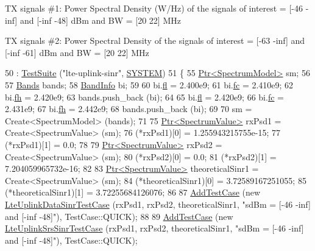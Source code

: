 TX signals \#1\+: Power Spectral Density (W/\+Hz) of the signals of interest = \mbox{[}-\/46 -\/inf\mbox{]} and \mbox{[}-\/inf -\/48\mbox{]} d\+Bm and BW = \mbox{[}20 22\mbox{]} M\+Hz

TX signals \#2\+: Power Spectral Density of the signals of interest = \mbox{[}-\/63 -\/inf\mbox{]} and \mbox{[}-\/inf -\/61\mbox{]} d\+Bm and BW = \mbox{[}20 22\mbox{]} M\+Hz
\begin{DoxyCode}
50   : \hyperlink{classns3_1_1TestSuite_a904b0c40583b744d30908aeb94636d1a}{TestSuite} (\textcolor{stringliteral}{"lte-uplink-sinr"}, \hyperlink{classns3_1_1TestSuite_a1ebfcab34ec8161e085e8e3a1855eae0a90c5529a26ab3a5ffcc6e57040dbd82e}{SYSTEM})
51 \{
55   \hyperlink{classns3_1_1Ptr}{Ptr<SpectrumModel>} sm;
56 
57   \hyperlink{namespacens3_a46ac9188e5cf43bd5292f7b67451246e}{Bands} bands;
58   \hyperlink{structns3_1_1BandInfo}{BandInfo} bi;
59 
60   bi.\hyperlink{structns3_1_1BandInfo_a5e9018ae65c7625cc6d5c3c0067a9104}{fl} = 2.400e9;
61   bi.\hyperlink{structns3_1_1BandInfo_a02fad8a855735ff477f736bb8cb7bc25}{fc} = 2.410e9;
62   bi.\hyperlink{structns3_1_1BandInfo_a78e8fadd8cafcc28d74bda6010e3d6f4}{fh} = 2.420e9;
63   bands.push\_back (bi);
64 
65   bi.\hyperlink{structns3_1_1BandInfo_a5e9018ae65c7625cc6d5c3c0067a9104}{fl} = 2.420e9;
66   bi.\hyperlink{structns3_1_1BandInfo_a02fad8a855735ff477f736bb8cb7bc25}{fc} = 2.431e9;
67   bi.\hyperlink{structns3_1_1BandInfo_a78e8fadd8cafcc28d74bda6010e3d6f4}{fh} = 2.442e9;
68   bands.push\_back (bi);
69 
70   sm = Create<SpectrumModel> (bands);
71 
75   \hyperlink{classns3_1_1Ptr}{Ptr<SpectrumValue>} rxPsd1 = Create<SpectrumValue> (sm);
76   (*rxPsd1)[0] = 1.255943215755e-15;
77   (*rxPsd1)[1] = 0.0;
78 
79   \hyperlink{classns3_1_1Ptr}{Ptr<SpectrumValue>} rxPsd2 = Create<SpectrumValue> (sm);
80   (*rxPsd2)[0] = 0.0;
81   (*rxPsd2)[1] = 7.204059965732e-16;
82 
83   \hyperlink{classns3_1_1Ptr}{Ptr<SpectrumValue>} theoreticalSinr1 = Create<SpectrumValue> (sm);
84   (*theoreticalSinr1)[0] = 3.72589167251055;
85   (*theoreticalSinr1)[1] = 3.72255684126076;
86 
87   \hyperlink{classns3_1_1TestCase_a3718088e3eefd5d6454569d2e0ddd835}{AddTestCase} (\textcolor{keyword}{new} \hyperlink{classLteUplinkDataSinrTestCase}{LteUplinkDataSinrTestCase} (rxPsd1, rxPsd2, 
      theoreticalSinr1, \textcolor{stringliteral}{"sdBm = [-46 -inf] and [-inf -48]"}), TestCase::QUICK);
88   
89   \hyperlink{classns3_1_1TestCase_a3718088e3eefd5d6454569d2e0ddd835}{AddTestCase} (\textcolor{keyword}{new} \hyperlink{classLteUplinkSrsSinrTestCase}{LteUplinkSrsSinrTestCase} (rxPsd1, rxPsd2, 
      theoreticalSinr1, \textcolor{stringliteral}{"sdBm = [-46 -inf] and [-inf -48]"}), TestCase::QUICK);

\end{DoxyCode}
